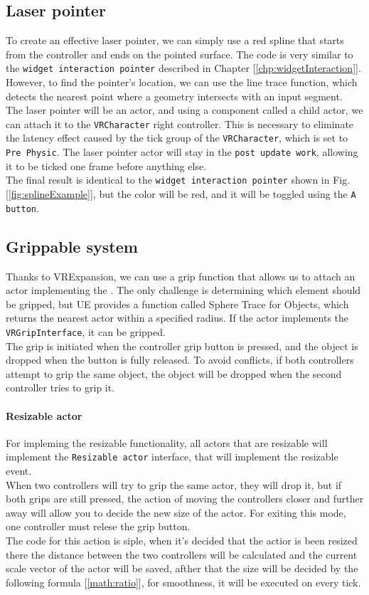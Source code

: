\subsection{Laser pointer}
\noindent
To create an effective laser pointer, we can simply use a red spline that starts from the controller and ends on the pointed surface. The code is very similar to the \texttt{widget interaction pointer} described in Chapter [\ref{chp:widgetInteraction}]. However, to find the pointer's location, we can use the line trace function, which detects the nearest point where a geometry intersects with an input segment.\\
The laser pointer will be an actor, and using a component called a child actor, we can attach it to the \texttt{VRCharacter} right controller. This is necessary to eliminate the latency effect caused by the tick group of the \texttt{VRCharacter}, which is set to \texttt{Pre Physic}. The laser pointer actor will stay in the \texttt{post update work}, allowing it to be ticked one frame before anything else.\\
The final result is identical to the \texttt{widget interaction pointer} shown in Fig. [\ref{fig:splineExample}], but the color will be red, and it will be toggled using the \texttt{A button}.

\subsection{Grippable system}
\noindent
Thanks to VRExpansion, we can use a grip function that allows us to attach an actor implementing the .
The only challenge is determining which element should be gripped, but \ac{UE} provides a function called Sphere Trace for Objects, which returns the nearest actor within a specified radius.
If the actor implements the \texttt{VRGripInterface}, it can be gripped.\\
The grip is initiated when the controller grip button is pressed, and the object is dropped when the button is fully released.
To avoid conflicts, if both controllers attempt to grip the same object, the object will be dropped when the second controller tries to grip it.

\paragraph{Resizable actor}
For impleming the resizable functionality, all actors that are resizable will implement the \texttt{Resizable actor} interface, that will implement the resizable event.\\
When two controllers will try to grip the same actor, they will drop it, but if both grips are still pressed, the action of moving the controllers closer and further away will allow you to decide the new size of the actor.
For exiting this mode, one controller must relese the grip button.\\
The code for this action is siple, when it's decided that the actior is been resized there the distance between the two controllers will be calculated and the current scale vector of the actor will be saved, afther that the size will be decided by the following formula [\ref{math:ratio}], for smoothness, it will be executed on every tick.

